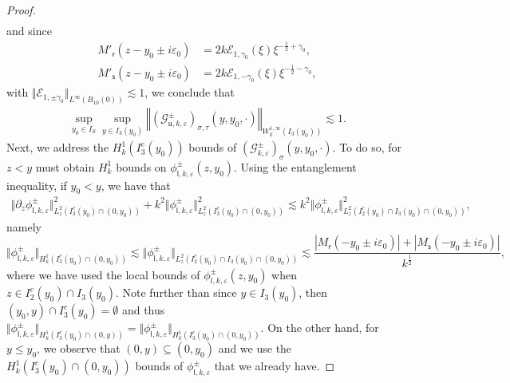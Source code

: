 \documentclass[11pt,reqno]{amsproc}
\theoremstyle{definition}
\numberwithin{equation}{section}
\newcommand{\G}{{\mathcal{G}}}
\newcommand{\sr}{{\mathsf{r}}}
\newcommand{\s}{{\mathsf{s}}}
\newcommand{\su}{{\mathsf{u}}}
\renewcommand{\sl}{{\mathsf{l}}}
\newcommand{\ep}{\varepsilon}
\newcommand{\p}{\partial}
\begin{document}
\begin{proof}
\begin{align*}
\end{align*}
and since 
\begin{align*}
M'_\sr(z-y_0\pm i\ep_0) &= 2k \mathcal{E}_{1,\gamma_0}(\xi) \xi^{-\frac12+\gamma_0}, 
\\
 M'_\s(z-y_0\pm i\ep_0) &= 2k \mathcal{E}_{1,-\gamma_0}(\xi) \xi^{-\frac12-\gamma_0},
\end{align*}
with $\Vert \mathcal{E}_{1,\pm \gamma_0}\Vert_{L^\infty(B_{10}(0))}\lesssim 1$, we conclude that 
\begin{align*}
\sup_{y_0\in I_S}\sup_{y\in I_3(y_0)} \left\Vert \left( \G_{\su, k,\ep}^\pm\right)_{\sigma,\tau}(y,y_0,\cdot) \right\Vert_{W^{1,\infty}_k(I_3(y_0))}\lesssim 1.
\end{align*}
Next, we address the $H^1_k(I_3^c(y_0))$ bounds of $\left( \G_{k,\ep}^\pm\right)_{\sigma}(y,y_0,\cdot)$. To do so, for $z < y$ must obtain $H^1_k$ bounds on $\phi_{\sl,k,\ep}^\pm(z,y_0)$. 
Using the entanglement inequality, if $y_0 < y$, we have that 
\begin{align*}
\Vert \p_z\phi_{\sl,k,\ep}^\pm \Vert_{L^2_z(I_3^c(y_0)\cap (0, y_0))}^2 + k^2 \Vert \phi_{\sl,k,\ep}^\pm \Vert_{L^2_z(I_3^c(y_0)\cap (0, y_0))}^2 \lesssim k^2 \Vert \phi_{\sl,k,\ep}^\pm \Vert_{L^2_z(I_2^c(y_0)\cap I_3(y_0)\cap (0, y_0))}^2,
\end{align*}
namely
\begin{equation}\label{eq:H1kphil}
\Vert \phi_{\sl,k,\ep}^\pm \Vert_{H^1_k(I_3^c(y_0)\cap (0, y_0))} \lesssim \Vert \phi_{\sl,k,\ep}^\pm \Vert_{L^2_z(I_2^c(y_0)\cap I_3(y_0)\cap (0, y_0))} \lesssim \frac{|M_\sr(-y_0 \pm i\ep_0)| + |M_\s( - y_0\pm i\ep_0)|}{k^\frac12},
\end{equation}
where we have used the local bounds of $\phi_{l,k,\ep}^\pm(z,y_0)$ when $z\in I_2^c(y_0)\cap I_3(y_0)$. Note further than since $y\in I_3(y_0)$, then $(y_0,y)\cap I_3^c(y_0)=\emptyset$ and thus $\Vert \phi_{\sl,k,\ep}^\pm \Vert_{H^1_k(I_3^c(y_0)\cap (0, y))} = \Vert \phi_{\sl,k,\ep}^\pm \Vert_{H^1_k(I_3^c(y_0)\cap (0, y_0))}$. On the other hand, for $y\leq y_0$, we observe that $(0,y) \subseteq (0,y_0)$ and we use the $H^1_k(I_3^c(y_0)\cap (0, y_0))$ bounds of $\phi_{\sl,k,\ep}^\pm$ that we already have.


\end{proof}
\end{document}
